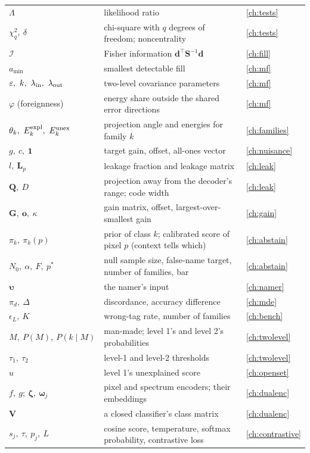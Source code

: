 \documentclass[11pt,a4paper,oneside,openany]{book}
\newcommand{\B}[1]{{\symbf{#1}}}
\newcommand{\B}[1]{{\bm{#1}}}
\newcommand{\T}{^{\top}}
\newcommand{\vd}{\B{d}}
\newcommand{\vone}{\B{1}}
\newcommand{\vo}{\B{o}}
\newcommand{\vzeta}{\B{\zeta}}
\newcommand{\vupsilon}{\B{\upsilon}}
\newcommand{\mS}{\B{S}}
\newcommand{\mL}{\B{L}}
\newcommand{\mG}{\B{G}}
\newcommand{\mQ}{\B{Q}}
\begin{document}
{\begin{longtable}{@{}p{}p{}p{}@{}}
$\Lambda$ & likelihood ratio & \cref{ch:tests}\\
$\chi^2_q,\ \delta$ & chi-square with $q$ degrees of freedom; noncentrality & \cref{ch:tests}\\
$\mathcal I$ & Fisher information $\vd\T\mS^{-1}\vd$ & \cref{ch:fill}\\
$a_{\min}$ & smallest detectable fill & \cref{ch:mf}\\
$\varepsilon,\ k,\ \lambda_{\rm in},\ \lambda_{\rm out}$ & two-level covariance parameters & \cref{ch:mf}\\
$\varphi$ (foreignness) & energy share outside the shared error directions & \cref{ch:mf}\\
$\theta_k,\ E^{\rm expl}_k,\ E^{\rm unex}_k$ & projection angle and energies for family $k$ & \cref{ch:families}\\
$g,\ c,\ \vone$ & target gain, offset, all-ones vector & \cref{ch:nuisance}\\
$l,\ \mL_p$ & leakage fraction and leakage matrix & \cref{ch:leak}\\
$\mQ,\ D$ & projection away from the decoder's range; code width & \cref{ch:leak}\\
$\mG,\ \vo,\ \kappa$ & gain matrix, offset, largest-over-smallest gain & \cref{ch:gain}\\
$\pi_k,\ \pi_k(p)$ & prior of class $k$; calibrated score of pixel $p$ (context tells which) & \cref{ch:abstain}\\
$N_0,\ \alpha,\ F,\ p^\ast$ & null sample size, false-name target, number of families, bar & \cref{ch:abstain}\\
$\vupsilon$ & the namer's input & \cref{ch:namer}\\
$\pi_d,\ \Delta$ & discordance, accuracy difference & \cref{ch:mde}\\
$\epsilon_L,\ K$ & wrong-tag rate, number of families & \cref{ch:bench}\\
$M,\ P(M),\ P(k\mid M)$ & man-made; level 1's and level 2's probabilities & \cref{ch:twolevel}\\
$\tau_1,\ \tau_2$ & level-1 and level-2 thresholds & \cref{ch:twolevel}\\
$u$ & level 1's unexplained score & \cref{ch:openset}\\
$f,\ g;\ \vzeta,\ \B{\omega}_j$ & pixel and spectrum encoders; their embeddings & \cref{ch:dualenc}\\
$\B{V}$ & a closed classifier's class matrix & \cref{ch:dualenc}\\
$s_j,\ \tau,\ p_j,\ L$ & cosine score, temperature, softmax probability, contrastive loss & \cref{ch:contrastive}\\

\end{longtable}}
\end{document}
